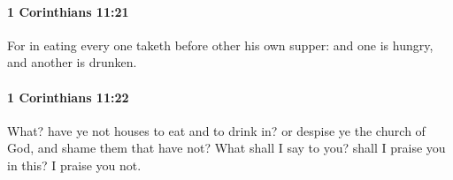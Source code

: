 		\paragraph{1 Corinthians 11:21} %
			\label{1CORINTHIANS-11-21}

			For in eating every one taketh before other his own supper: and one is hungry, and another is drunken.

			\begin{framed}
				\scriptsize
				\begin{compactdesc}
					\item[SBLG] 
				\end{compactdesc}
			\end{framed}

		\paragraph{1 Corinthians 11:22} %
			\label{1CORINTHIANS-11-22}

			What?  have ye not houses to eat and to drink in?  or despise ye the church of God, and shame them that have not?  What shall I say to you?  shall I praise you in this?  I praise you not.

